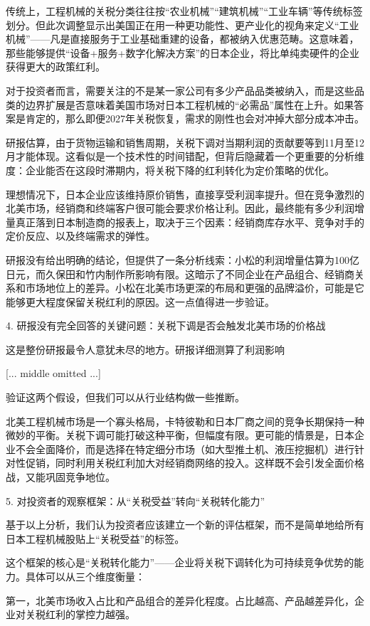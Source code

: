 \documentclass[11pt]{ctexart}
\begin{document}
传统上，工程机械的关税分类往往按“农业机械”“建筑机械”“工业车辆”等传统标签划分。但此次调整显示出美国正在用一种更功能性、更产业化的视角来定义“工业机械”——凡是直接服务于工业基础重建的设备，都被纳入优惠范畴。这意味着，那些能够提供“设备+服务+数字化解决方案”的日本企业，将比单纯卖硬件的企业获得更大的政策红利。

对于投资者而言，需要关注的不是某一家公司有多少产品品类被纳入，而是这些品类的边界扩展是否意味着美国市场对日本工程机械的“必需品”属性在上升。如果答案是肯定的，那么即便2027年关税恢复，需求的刚性也会对冲掉大部分成本冲击。

研报估算，由于货物运输和销售周期，关税下调对当期利润的贡献要等到11月至12月才能体现。这看似是一个技术性的时间错配，但背后隐藏着一个更重要的分析维度：企业能否在这段时滞期内，将关税下降的红利转化为定价策略的优化。

理想情况下，日本企业应该维持原价销售，直接享受利润率提升。但在竞争激烈的北美市场，经销商和终端客户很可能会要求价格让利。因此，最终能有多少利润增量真正落到日本制造商的报表上，取决于三个因素：经销商库存水平、竞争对手的定价反应、以及终端需求的弹性。

研报没有给出明确的结论，但提供了一条分析线索：小松的利润增量估算为100亿日元，而久保田和竹内制作所影响有限。这暗示了不同企业在产品组合、经销商关系和市场地位上的差异。小松在北美市场更深的布局和更强的品牌溢价，可能是它能够更大程度保留关税红利的原因。这一点值得进一步验证。

4. 研报没有完全回答的关键问题：关税下调是否会触发北美市场的价格战

这是整份研报最令人意犹未尽的地方。研报详细测算了利润影响

[... middle omitted ...]

验证这两个假设，但我们可以从行业结构做一些推断。

北美工程机械市场是一个寡头格局，卡特彼勒和日本厂商之间的竞争长期保持一种微妙的平衡。关税下调可能打破这种平衡，但幅度有限。更可能的情景是，日本企业不会全面降价，而是选择在特定细分市场（如大型推土机、液压挖掘机）进行针对性促销，同时利用关税红利加大对经销商网络的投入。这样既不会引发全面价格战，又能巩固竞争地位。

5. 对投资者的观察框架：从“关税受益”转向“关税转化能力”

基于以上分析，我们认为投资者应该建立一个新的评估框架，而不是简单地给所有日本工程机械股贴上“关税受益”的标签。

这个框架的核心是“关税转化能力”——企业将关税下调转化为可持续竞争优势的能力。具体可以从三个维度衡量：

第一，北美市场收入占比和产品组合的差异化程度。占比越高、产品越差异化，企业对关税红利的掌控力越强。
\end{document}
